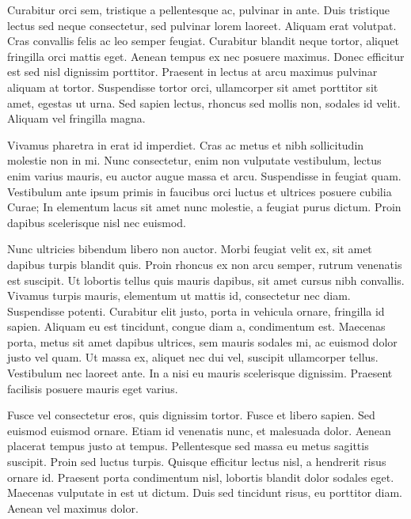 \documentclass{article}
\begin{document}
Curabitur orci sem, tristique a pellentesque ac, pulvinar in ante. Duis tristique lectus sed neque consectetur, sed pulvinar lorem laoreet. Aliquam erat volutpat. Cras convallis felis ac leo semper feugiat. Curabitur blandit neque tortor, aliquet fringilla orci mattis eget. Aenean tempus ex nec posuere maximus. Donec efficitur est sed nisl dignissim porttitor. Praesent in lectus at arcu maximus pulvinar aliquam at tortor. Suspendisse tortor orci, ullamcorper sit amet porttitor sit amet, egestas ut urna. Sed sapien lectus, rhoncus sed mollis non, sodales id velit. Aliquam vel fringilla magna.

Vivamus pharetra in erat id imperdiet. Cras ac metus et nibh sollicitudin molestie non in mi. Nunc consectetur, enim non vulputate vestibulum, lectus enim varius mauris, eu auctor augue massa et arcu. Suspendisse in feugiat quam. Vestibulum ante ipsum primis in faucibus orci luctus et ultrices posuere cubilia Curae; In elementum lacus sit amet nunc molestie, a feugiat purus dictum. Proin dapibus scelerisque nisl nec euismod.

Nunc ultricies bibendum libero non auctor. Morbi feugiat velit ex, sit amet dapibus turpis blandit quis. Proin rhoncus ex non arcu semper, rutrum venenatis est suscipit. Ut lobortis tellus quis mauris dapibus, sit amet cursus nibh convallis. Vivamus turpis mauris, elementum ut mattis id, consectetur nec diam. Suspendisse potenti. Curabitur elit justo, porta in vehicula ornare, fringilla id sapien. Aliquam eu est tincidunt, congue diam a, condimentum est. Maecenas porta, metus sit amet dapibus ultrices, sem mauris sodales mi, ac euismod dolor justo vel quam. Ut massa ex, aliquet nec dui vel, suscipit ullamcorper tellus. Vestibulum nec laoreet ante. In a nisi eu mauris scelerisque dignissim. Praesent facilisis posuere mauris eget varius.

Fusce vel consectetur eros, quis dignissim tortor. Fusce et libero sapien. Sed euismod euismod ornare. Etiam id venenatis nunc, et malesuada dolor. Aenean placerat tempus justo at tempus. Pellentesque sed massa eu metus sagittis suscipit. Proin sed luctus turpis. Quisque efficitur lectus nisl, a hendrerit risus ornare id. Praesent porta condimentum nisl, lobortis blandit dolor sodales eget. Maecenas vulputate in est ut dictum. Duis sed tincidunt risus, eu porttitor diam. Aenean vel maximus dolor.
\end{document}
